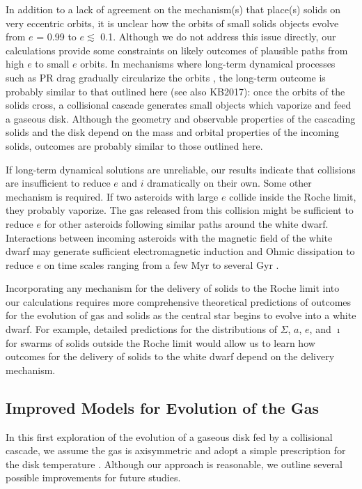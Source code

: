 \documentclass[12pt,preprint]{aastex}
\begin{document}
In addition to a lack of agreement on the mechanism(s) that place(s) solids on very 
eccentric orbits, it is unclear how the orbits of small solids objects evolve from 
$e$ = 0.99 to $e \lesssim$ 0.1. Although we do not address this issue directly, our
calculations provide some constraints on likely outcomes of plausible paths from high
$e$ to small $e$ orbits. In mechanisms where long-term dynamical processes such as 
PR drag gradually circularize the orbits \citep[e.g.,][]{veras2014a}, the long-term 
outcome is probably similar to that outlined here (see also KB2017): once the orbits 
of the solids cross, a collisional cascade generates small objects which vaporize and 
feed a gaseous disk. Although the geometry and observable properties of the cascading 
solids and the disk depend on the mass and orbital properties of the incoming solids, 
outcomes are probably similar to those outlined here.

If long-term dynamical solutions are unreliable, our results indicate that collisions
are insufficient to reduce $e$ and $i$ dramatically on their own. Some other mechanism
is required. If two asteroids with large $e$ collide inside the Roche limit, they
probably vaporize. The gas released from this collision might be sufficient to reduce
$e$ for other asteroids following similar paths around the white dwarf.  
Interactions between incoming asteroids with the magnetic field of the white dwarf 
may generate sufficient electromagnetic induction and Ohmic dissipation to reduce $e$
on time scales ranging from a few Myr to several Gyr \citep[Bromley \& Kenyon, in 
preparation; see also][]{li1998}.

Incorporating any mechanism for the delivery of solids to the Roche limit into our calculations 
requires more comprehensive theoretical predictions of outcomes for the evolution of gas
and solids as the central star begins to evolve into a white dwarf.  For example, detailed 
predictions for the distributions of $\Sigma$, $a$, $e$, and $\imath$ for swarms of solids 
outside the Roche limit would allow us to learn how outcomes for the delivery of solids to 
the white dwarf depend on the delivery mechanism.

\subsection{Improved Models for Evolution of the Gas}
\label{sec: disc-gas}

In this first exploration of the evolution of a gaseous disk fed by a collisional cascade, 
we assume the gas is axisymmetric and adopt a simple prescription for the disk temperature
\citep[see also][]{jura2008,melis2010b}.  Although our approach is reasonable, we outline 
several possible improvements for future studies. 
\end{document}
